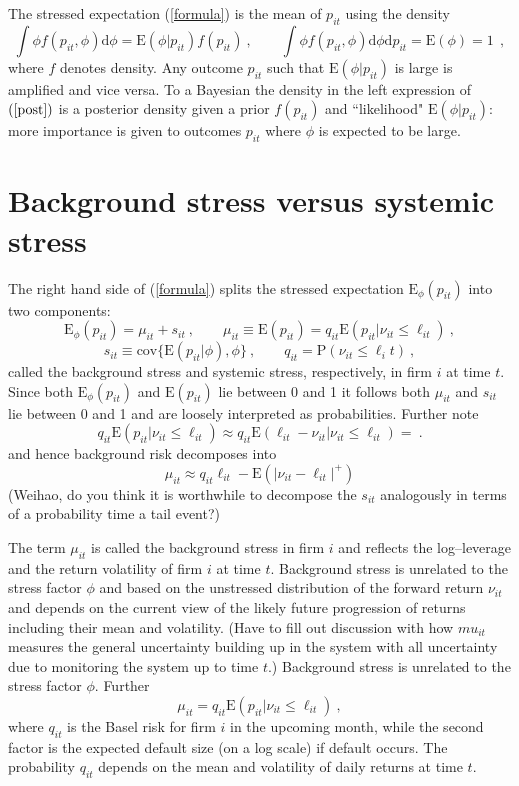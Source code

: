 \documentclass[authoryear]{elsarticle}
\newcommand{\E}{\mathrm{E}}
\newcommand{\cov}{\mathrm{cov}}
\newcommand{\Es}{\E_\phi}
\newcommand{\de}{\mathrm{d}}
\newcommand{\eref}[1]{(\ref{#1})}
\newcommand{\cq}{\ , \qquad}
\renewcommand{\P}{\mathrm{P}}
\newcommand{\be}[1]{\begin{equation}\label{#1}}
\newcommand{\ee}{\end{equation}}
\begin{document}
The stressed expectation \eref{formula}  is the mean of $p_{it}$  using the  density
\be{post}
\int \phi f(p_{it},\phi)\de \phi= \E(\phi|p_{it})f(p_{it})\cq \int \phi f(p_{it},\phi)\de \phi\de p_{it} = \E(\phi) = 1\ 
\  ,
\ee
where $f$ denotes density.  
Any outcome $p_{it}$ such that $\E(\phi|p_{it})$ is large  is amplified and vice versa.   To a Bayesian the density in the left  expression of $\eref{post}$ is a posterior density given a prior $f(p_{it})$ and ``likelihood" $\E(\phi|p_{it})$: more importance is given to outcomes   $p_{it}$  where $\phi$ is expected to be large. 

\section{Background stress versus systemic stress}

The right hand side of \eref{formula} splits the stressed expectation $\Es(p_{it})$ into two components: 
\be{vsstress}
\Es(p_{it}) =\mu_{it}+s_{it}\cq 
 \mu_{it} \equiv \E(p_{it})=q_{it}\E(p_{it}|\nu_{it}\le \ell_{it}) \ ,
\ee
$$
s_{it} \equiv \cov\{\E(p_{it}|\phi),\phi\}\cq q_{it} = \P(\nu_{it}\le \ell_it)\ , 
$$
called  the background stress  and systemic stress, respectively, in firm $i$ at time $t$.  Since both $\Es(p_{it})$ and $\E(p_{it})$ lie between 0 and 1 it follows both $\mu_{it}$ and $s_{it}$ lie between 0 and 1 and  are loosely interpreted as probabilities.  Further note 
$$
q_{it}\E(p_{it}|\nu_{it}\le \ell_{it}) \approx q_{it}\E(\ell_{it}-\nu_{it}|\nu_{it}\le \ell_{it}) = \ .
$$
and hence background risk decomposes into
$$
\mu_{it} \approx q_{it}\ell_{it} - \E(|\nu_{it}-\ell_{it}|^+)
$$
(Weihao, do you think it is worthwhile to decompose the $s_{it}$ analogously in terms of a probability time a tail event?) 

The  term $\mu_{it}$  is called the background stress in firm $i$ and  reflects the log--leverage and the return volatility of firm $i$ at time $t$.  Background stress is unrelated to the stress factor $\phi$ and based on the unstressed distribution of the forward return $\nu_{it}$ and depends on the current view of the likely future progression of returns including their mean and volatility.     (Have to fill out discussion with how $mu_{it}$ measures the general uncertainty building up in the system with all  uncertainty  due to monitoring the system up to time $t$.)  Background stress is unrelated to the stress factor $\phi$.  Further
\be{mstress}
\mu_{it}=q_{it}\E(p_{it}|\nu_{it}\le \ell_{it})\ ,
\ee
where  $q_{it}$ is the Basel risk for  firm $i$  in the upcoming month,  while the second factor is the expected default size  (on a log scale)  if default occurs.
The probability $q_{it}$ depends on the  mean and volatility of daily returns at time $t$.
\end{document}
